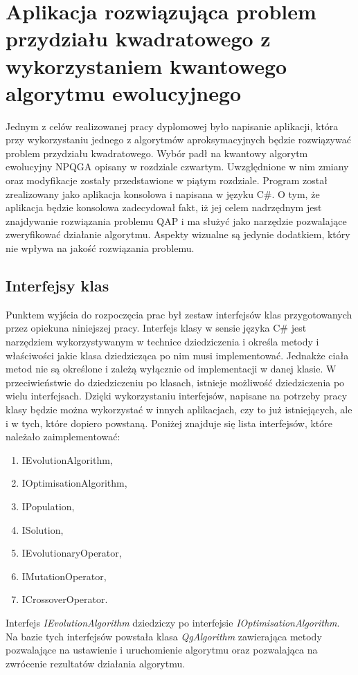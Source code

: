 \chapter{Aplikacja rozwiązująca problem przydziału kwadratowego z wykorzystaniem kwantowego algorytmu ewolucyjnego}
\label{cha:aplikacja}
Jednym z celów realizowanej pracy dyplomowej było napisanie aplikacji, która przy wykorzystaniu jednego z algorytmów aproksymacyjnych będzie rozwiązywać problem przydziału kwadratowego. Wybór padł na kwantowy algorytm ewolucyjny NPQGA opisany w rozdziale czwartym. Uwzględnione w nim zmiany oraz modyfikacje zostały przedstawione w piątym rozdziale. Program został zrealizowany jako aplikacja konsolowa i napisana w języku C\#. O tym, że aplikacja będzie konsolowa zadecydował fakt, iż jej celem nadrzędnym jest znajdywanie rozwiązania problemu QAP i ma służyć jako narzędzie pozwalające zweryfikować działanie algorytmu. Aspekty wizualne są jedynie dodatkiem, który nie wpływa na jakość rozwiązania problemu.

\section{Interfejsy klas}
Punktem wyjścia do rozpoczęcia prac był zestaw interfejsów klas przygotowanych przez opiekuna niniejszej pracy. Interfejs klasy w sensie języka C\# jest narzędziem wykorzystywanym w technice dziedziczenia i określa metody i właściwości jakie klasa dziedzicząca po nim musi implementować. Jednakże ciała metod nie są określone i zależą wyłącznie od implementacji w danej klasie. W przeciwieństwie do dziedziczeniu po klasach, istnieje możliwość dziedziczenia po wielu interfejsach. Dzięki wykorzystaniu interfejsów, napisane na potrzeby pracy klasy będzie można wykorzystać w innych aplikacjach, czy to już istniejących, ale i w tych, które dopiero powstaną. Poniżej znajduje się lista interfejsów, które należało zaimplementować:
\begin{enumerate}
\item IEvolutionAlgorithm,
\item IOptimisationAlgorithm,
\item IPopulation,
\item ISolution,
\item IEvolutionaryOperator,
\item IMutationOperator,
\item ICrossoverOperator.
\end{enumerate}

Interfejs \textit{IEvolutionAlgorithm} dziedziczy po interfejsie \textit{IOptimisationAlgorithm}. Na bazie tych interfejsów powstała klasa \textit{QgAlgorithm} zawierająca metody pozwalające na ustawienie i uruchomienie algorytmu oraz pozwalająca na zwrócenie rezultatów działania algorytmu.

